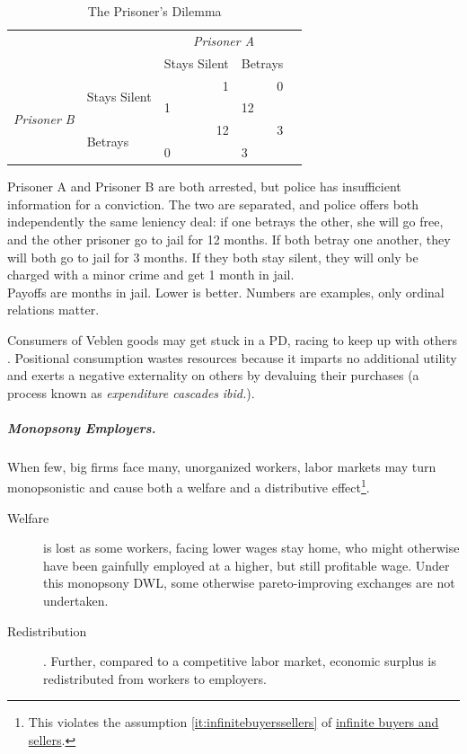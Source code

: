 \begin{table}
			\caption{The Prisoner's Dilemma}
			\label{tab:PD}
			\begin{center}
			\begin{tabular}{m{1cm}m{2,3cm}m{}m{}m{}}
				& & \multicolumn{2}{c}{\emph{Prisoner A}} \\
				& &Stays Silent & Betrays\\ 
				\cline{3-4}
				\multicolumn{1}{c}{\multirow{4}{*}{\emph{Prisoner B}}} & \multirow{2}{}{Stays Silent} & 		\multicolumn{1}{|r|}{1} & \multicolumn{1}{r|}{0}\\ 
				\multicolumn{1}{c}{} & \multicolumn{1}{c}{}& \multicolumn{1}{|l|}{1} & \multicolumn{1}{l|}{12}\\ 
				\cline{3-4}
				\multicolumn{1}{c}{} & \multirow{2}{2,3cm}{Betrays} & \multicolumn{1}{|r|}{12} & \multicolumn{1}{r|}{3}\\ 
				\multicolumn{1}{c}{} & \multicolumn{1}{c}{}& \multicolumn{1}{|l|}{0} & \multicolumn{1}{l|}{3}\\ 
				\cline{3-4}
			\end{tabular}
			\end{center}
			\scriptsize{Prisoner A and Prisoner B are both arrested, but police has insufficient information for a conviction. The two are separated, and police offers both independently the same leniency deal: if one betrays the other, she will go free, and the other prisoner go to jail for 12 months. If both betray one another, they will both go to jail for 3 months. If they both stay silent, they will only be charged with a minor crime and get 1 month in jail. \\
			Payoffs are months in jail. Lower is better. Numbers are examples, only ordinal relations matter.}
		\end{table}


Consumers of Veblen goods may get stuck in a \gls{PD}, racing to keep up with others \citep{Frank1987}. Positional consumption wastes resources because it imparts no additional utility and exerts a negative externality on others by devaluing their purchases (a process known as \emph{expenditure cascades} \emph{ibid.}). 

\subparagraph[Monopsony Employers]{Monopsony Employers.} \label{sec:monopsonyemployers} When few, big firms face many, unorganized workers, labor markets may turn monopsonistic and cause both a welfare and a distributive effect\footnote{
	This violates the  assumption \ref{it:infinitebuyerssellers} of \hyperref[it:infinitebuyerssellers]{infinite buyers and sellers}.}.
\begin{description}
	\item[Welfare] is lost as some workers, facing lower wages stay home, who might otherwise have been gainfully employed at a higher, but still profitable wage. Under this monopsony \gls{DWL}, some otherwise pareto-improving exchanges are not undertaken. 
	\item[Redistribution]. Further, compared to a competitive labor market, economic surplus is redistributed from workers to employers. 
\end{description}

